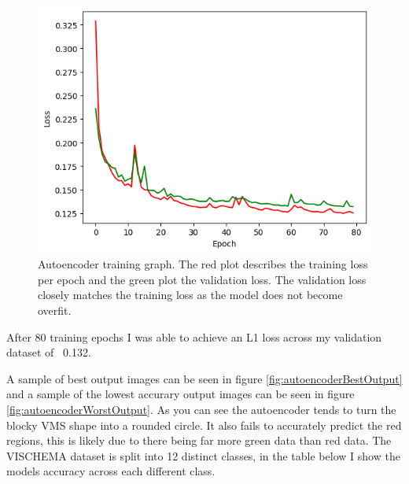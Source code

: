 \documentclass{UoYCSproject}
\begin{document}
\begin{figure}[h]
    \centering
    \includegraphics[width=\linewidth]{Autoencoder Training Curve}
    \caption{Autoencoder training graph. The red plot describes the training loss per epoch and the green plot the validation loss. The validation loss closely matches the training loss as the model does not become overfit.}
    \label{fig:autoencoderTraining}
\end{figure}


After 80 training epochs I was able to achieve an L1 loss across my validation dataset of ~0.132.

A sample of best output images can be seen in figure \ref{fig:autoencoderBestOutput} and a sample of the lowest accurary output images can be seen in figure \ref{fig:autoencoderWorstOutput}. As you can see the autoencoder tends to turn the blocky VMS shape into a rounded circle. It also fails to accurately predict the red regions, this is likely due to there being far more green data than red data. The VISCHEMA dataset is split into 12 distinct classes, in the table below I show the models accuracy across each different class.
\end{document}
